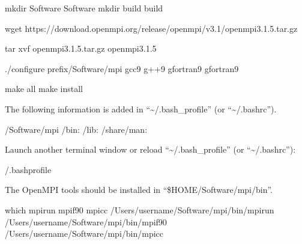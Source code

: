 \documentclass[a4paper,11pt,oneside,english]{sphinxmanual}
\begin{document}
\begin{sphinxVerbatim}[commandchars=\\\{\}]
\PYGZdl{}  
\PYGZdl{} mkdir Software
\PYGZdl{}  Software
\PYGZdl{} mkdir build
\PYGZdl{}  build

\PYGZdl{} wget https://download.open\PYGZhy{}mpi.org/release/open\PYGZhy{}mpi/v3.1/openmpi\PYGZhy{}3.1.5.tar.gz

\PYGZdl{} tar \PYGZhy{}xvf openmpi\PYGZhy{}3.1.5.tar.gz
\PYGZdl{}  openmpi\PYGZhy{}3.1.5

\PYGZdl{} ./configure \PYGZhy{}\PYGZhy{}prefix/Software/mpi gcc\PYGZhy{}9 g++\PYGZhy{}9 gfortran\PYGZhy{}9 gfortran\PYGZhy{}9

\PYGZdl{} make all
\PYGZdl{} make install
\end{sphinxVerbatim}

The following information is added in “\textasciitilde{}/.bash\_profile” (or “\textasciitilde{}/.bashrc”).

\begin{sphinxVerbatim}[commandchars=\\\{\}]
/Software/mpi
 /bin:
 /lib:
 /share/man:
\end{sphinxVerbatim}

Launch another terminal window or reload “\textasciitilde{}/.bash\_profile” (or “\textasciitilde{}/.bashrc”):

\begin{sphinxVerbatim}[commandchars=\\\{\}]
\PYGZdl{}  \PYGZti{}/.bash\PYGZus{}profile
\end{sphinxVerbatim}

The OpenMPI tools should be installed in “\$HOME/Software/mpi/bin”.

\begin{sphinxVerbatim}[commandchars=\\\{\}]
\PYGZdl{} which mpirun mpif90 mpicc
/Users/\PYG{o}{[}username\PYG{o}{]}/Software/mpi/bin/mpirun
/Users/\PYG{o}{[}username\PYG{o}{]}/Software/mpi/bin/mpif90
/Users/\PYG{o}{[}username\PYG{o}{]}/Software/mpi/bin/mpicc
\end{sphinxVerbatim}
\end{document}
